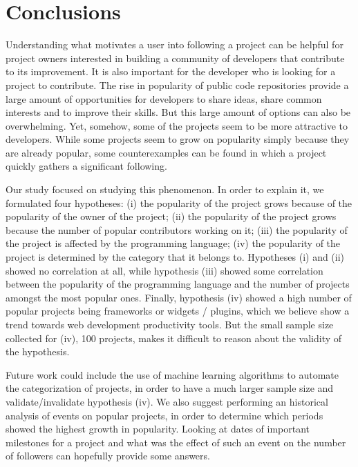 
\section{Conclusions}
\label{sec:conclusions}

Understanding what motivates a user into following a project can be helpful for project owners interested in building a community of developers that contribute to its improvement. It is also important for the developer who is looking for a project to contribute. The rise in popularity of public code repositories provide a large amount of opportunities for developers to share ideas, share common interests and to improve their skills. But this large amount of options can also be overwhelming. Yet, somehow, some of the projects seem to be more attractive to developers. While some projects seem to grow on popularity simply because they are already popular, some counterexamples can be found in which a project quickly gathers a significant following.

Our study focused on studying this phenomenon. In order to explain it, we formulated four hypotheses: (i) the popularity of the project grows because of the popularity of the owner of the project; (ii) the popularity of the project grows because the number of popular contributors working on it; (iii) the popularity of the project is affected by the programming language; (iv) the popularity of the project is determined by the category that it belongs to. Hypotheses (i) and (ii) showed no correlation at all, while hypothesis (iii) showed some correlation between the popularity of the programming language and the number of projects amongst the most popular ones. Finally, hypothesis (iv) showed a high number of popular projects being frameworks or widgets / plugins, which we believe show a trend towards web development productivity tools.  But the small sample size collected for (iv), 100 projects, makes it difficult to reason about the validity of the hypothesis.

Future work could include the use of machine learning algorithms to automate the categorization of projects, in order to have a much larger sample size and validate/invalidate hypothesis (iv). We also suggest performing an historical analysis of events on popular projects, in order to determine which periods showed the highest growth in popularity. Looking at dates of important milestones for a project and what was the effect of such an event on the number of followers can hopefully provide some answers.
